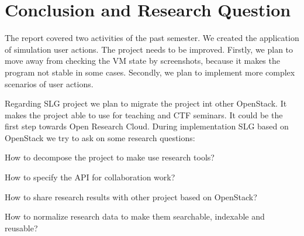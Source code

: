\section{Conclusion and Research Question}

The report covered two activities of the past semester. We created the application of simulation user actions. The project needs to be improved. Firstly, we plan to move away from checking the VM state by screenshots, because it makes the program not stable in some cases. Secondly, we plan to implement more complex scenarios of user actions. 

Regarding SLG project we plan to migrate the project int other OpenStack. It makes the project able to use for teaching and CTF seminars. It could be the first step towards Open Research Cloud. During implementation SLG based on OpenStack we try to ask on some research questions: 
\begin{compactitem}
\item How to decompose the project to make use research tools?
\item How to specify the API for collaboration work?
\item How to share research results with other project based on OpenStack?
\item How to normalize research data to make them searchable, indexable and reusable?  
\end{compactitem}